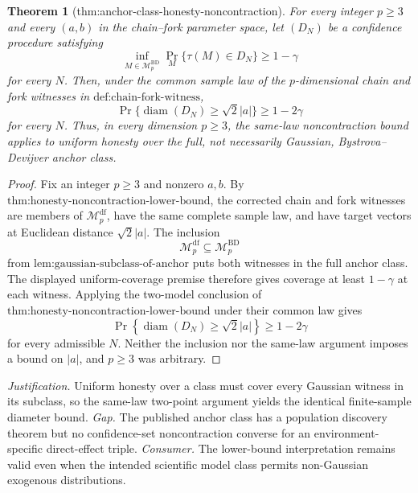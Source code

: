 \documentclass{article}
\newtheorem{theorem}{Theorem}
\begin{document}
\begin{theorem}[thm:anchor-class-honesty-noncontraction]\label{thm:anchor-class-honesty-noncontraction}
For every integer \(p\ge3\) and every \((a,b)\) in the chain--fork parameter space, let \((D_N)\) be a confidence procedure satisfying
\[
 \inf_{M\in\mathcal M_p^{\mathrm{BD}}}
 \Pr_M\{\tau(M)\in D_N\}\ge 1-\gamma
\]
for every \(N\).  Then, under the common sample law of the \(p\)-dimensional chain and fork witnesses in \(\text{def:chain-fork-witness}\),
\[
 \Pr\{\operatorname{diam}(D_N)\ge\sqrt2|a|\}\ge1-2\gamma
\]
for every \(N\).  Thus, in every dimension \(p\ge3\), the same-law noncontraction bound applies to uniform honesty over the full, not necessarily Gaussian, Bystrova--Devijver anchor class.
\end{theorem}
\begin{proof}
Fix an integer \(p\ge3\) and nonzero \(a,b\).  By \(\text{thm:honesty-noncontraction-lower-bound}\), the corrected chain and fork witnesses are members of \(\mathcal M_p^{\mathrm{df}}\), have the same complete sample law, and have target vectors at Euclidean distance \(\sqrt2|a|\).  The inclusion
\[
 \mathcal M_p^{\mathrm{df}}\subseteq\mathcal M_p^{\mathrm{BD}}
\]
from \(\text{lem:gaussian-subclass-of-anchor}\) puts both witnesses in the full anchor class.  The displayed uniform-coverage premise therefore gives coverage at least \(1-\gamma\) at each witness.  Applying the two-model conclusion of \(\text{thm:honesty-noncontraction-lower-bound}\) under their common law gives
\[
 \Pr\!\left\{\operatorname{diam}(D_N)\ge\sqrt2|a|\right\}\ge1-2\gamma
\]
for every admissible \(N\).  Neither the inclusion nor the same-law argument imposes a bound on \(|a|\), and \(p\ge3\) was arbitrary.
\end{proof}
\par\smallskip\noindent \textit{Justification.} Uniform honesty over a class must cover every Gaussian witness in its subclass, so the same-law two-point argument yields the identical finite-sample diameter bound. \textit{Gap.} The published anchor class has a population discovery theorem but no confidence-set noncontraction converse for an environment-specific direct-effect triple. \textit{Consumer.} The lower-bound interpretation remains valid even when the intended scientific model class permits non-Gaussian exogenous distributions.
\end{document}
